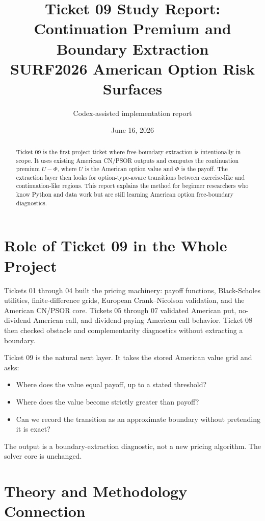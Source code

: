 \documentclass[11pt,a4paper]{article}
\title{\textbf{Ticket 09 Study Report: Continuation Premium and Boundary Extraction}\\
\large SURF2026 American Option Risk Surfaces}
\author{Codex-assisted implementation report}
\date{June 16, 2026}
\begin{document}
\maketitle

\begin{abstract}
Ticket 09 is the first project ticket where free-boundary extraction is intentionally in scope.
It uses existing American CN/PSOR outputs and computes the continuation premium
\(U-\Phi\), where \(U\) is the American option value and \(\Phi\) is the payoff. The extraction
layer then looks for option-type-aware transitions between exercise-like and continuation-like
regions. This report explains the method for beginner researchers who know Python and data work
but are still learning American option free-boundary diagnostics.
\end{abstract}

\tableofcontents
\newpage

\section{Role of Ticket 09 in the Whole Project}

Tickets 01 through 04 built the pricing machinery: payoff functions, Black-Scholes utilities,
finite-difference grids, European Crank--Nicolson validation, and the American CN/PSOR core.
Tickets 05 through 07 validated American put, no-dividend American call, and dividend-paying
American call behavior. Ticket 08 then checked obstacle and complementarity diagnostics without
extracting a boundary.

Ticket 09 is the natural next layer. It takes the stored American value grid and asks:
\begin{itemize}
  \item Where does the value equal payoff, up to a stated threshold?
  \item Where does the value become strictly greater than payoff?
  \item Can we record the transition as an approximate boundary without pretending it is exact?
\end{itemize}

The output is a boundary-extraction diagnostic, not a new pricing algorithm. The solver core is
unchanged.

\section{Theory and Methodology Connection}
\end{document}
